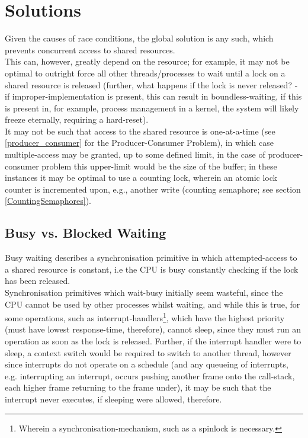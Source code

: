 \section{Solutions}
\label{solutions}
Given the causes of race conditions, the global solution is any such, which prevents concurrent access to shared resources.\\
This can, however, greatly depend on the resource; for example, it may not be optimal to outright force all other threads/processes to wait until a lock on a shared resource is released (further, what happens if the lock is never released? - if improper-implementation is present, this can result in boundless-waiting, if this is present in, for example, process management in a kernel, the system will likely freeze eternally, requiring a hard-reset).\\
It may not be such that access to the shared resource is one-at-a-time (see \ref{producer_consumer} for the Producer-Consumer Problem), in which case multiple-access may be granted, up to some defined limit, in the case of producer-consumer problem this upper-limit would be the size of the buffer; in these instances it may be optimal to use a counting lock, wherein an atomic lock counter is incremented upon, e.g., another write (counting semaphore; see section \ref{CountingSemaphores}).

\subsection{Busy vs. Blocked Waiting}
Busy waiting describes a synchronisation primitive in which attempted-access to a shared resource is constant, i.e the CPU is busy constantly checking if the lock has been released.\\
Synchronisation primitives which wait-busy initially seem wasteful, since the CPU cannot be used by other processes whilst waiting, and while this is true, for some operations, such as interrupt-handlers\footnote{Wherein a synchronisation-mechanism, such as a spinlock is necessary.}, which have the highest priority (must have lowest response-time, therefore), cannot sleep, since they must run an operation as soon as the lock is released. Further, if the interrupt handler were to sleep, a context switch would be required to switch to another thread, however since interrupts do not operate on a schedule (and any queueing of interrupts, e.g. interrupting an interrupt, occurs pushing another frame onto the call-stack, each higher frame returning to the frame under), it may be such that the interrupt never executes, if sleeping were allowed, therefore.

